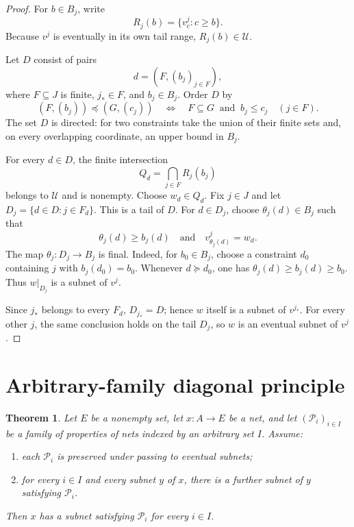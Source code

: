 \documentclass[11pt]{article}
\newtheorem{theorem}{Theorem}
\theoremstyle{definition}
\newcommand{\cU}{\mathcal U}
\newcommand{\cP}{\mathcal P}
\begin{document}
\begin{proof}
For $b\in B_j$, write
\[
 R_j(b)=\{v^j_c:c\geq b\}.
\]
Because $v^j$ is eventually in its own tail range, $R_j(b)\in\cU$.

Let $D$ consist of pairs
\[
 d=(F,(b_j)_{j\in F}),
\]
where $F\subseteq J$ is finite, $j_*\in F$, and $b_j\in B_j$.  Order $D$ by
\[
 (F,(b_j))\preceq(G,(c_j))
 \quad\Longleftrightarrow\quad
 F\subseteq G\ \text{ and }\ b_j\leq c_j\quad(j\in F).
\]
The set $D$ is directed: for two constraints take the union of their finite
sets and, on every overlapping coordinate, an upper bound in $B_j$.

For every $d\in D$, the finite intersection
\[
 Q_d=\bigcap_{j\in F}R_j(b_j)
\]
belongs to $\cU$ and is nonempty.  Choose $w_d\in Q_d$.  Fix $j\in J$ and
let $D_j=\{d\in D:j\in F_d\}$.  This is a tail of $D$.  For $d\in D_j$,
choose $\theta_j(d)\in B_j$ such that
\[
 \theta_j(d)\geq b_j(d)
 \quad\text{and}\quad
 v^j_{\theta_j(d)}=w_d.
\]
The map $\theta_j\colon D_j\to B_j$ is final.  Indeed, for $b_0\in B_j$,
choose a constraint $d_0$ containing $j$ with $b_j(d_0)=b_0$.  Whenever
$d\succeq d_0$, one has
$\theta_j(d)\geq b_j(d)\geq b_0$.  Thus $w|_{D_j}$ is a subnet of $v^j$.

Since $j_*$ belongs to every $F_d$, $D_{j_*}=D$; hence $w$ itself is a subnet
of $v^{j_*}$.  For every other $j$, the same conclusion holds on the tail
$D_j$, so $w$ is an eventual subnet of $v^j$.
\end{proof}

\section{Arbitrary-family diagonal principle}

\begin{theorem}
Let $E$ be a nonempty set, let $x\colon A\to E$ be a net, and let
$(\cP_i)_{i\in I}$ be a family of properties of nets indexed by an arbitrary
set $I$.  Assume:
\begin{enumerate}[label=\textup{(\roman*)}]
\item each $\cP_i$ is preserved under passing to eventual subnets;
\item for every $i\in I$ and every subnet $y$ of $x$, there is a further
subnet of $y$ satisfying $\cP_i$.
\end{enumerate}
Then $x$ has a subnet satisfying $\cP_i$ for every $i\in I$.
\end{theorem}
\end{document}

